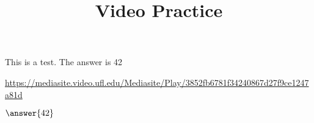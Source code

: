 \documentclass[•]{ximera}
\title{Video Practice}
\author{}
\date{}
\begin{document}
\maketitle
\begin{problem}

This is a test.  The answer is 42

\begin{hint}
\url{https://mediasite.video.ufl.edu/Mediasite/Play/3852fb6781f34240867d27f9ce1247a81d}
\end{hint}

$\answer{42}$

\end{problem}
\end{document}
